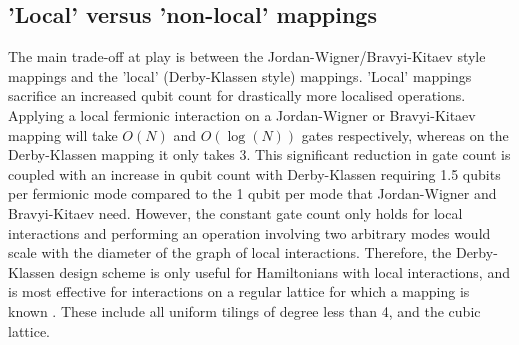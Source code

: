 \documentclass[twoside]{article}
\begin{document}
   \subsection{'Local' versus 'non-local' mappings}
The main trade-off at play is between the Jordan-Wigner/Bravyi-Kitaev style mappings and the 'local' (Derby-Klassen style) mappings. 'Local' mappings sacrifice an increased qubit count for drastically more localised operations. Applying a local fermionic interaction on a Jordan-Wigner or Bravyi-Kitaev mapping will take $O(N)$ and $O(\log(N))$ gates respectively, whereas on the Derby-Klassen mapping it only takes 3. This significant reduction in gate count is coupled with an increase in qubit count with Derby-Klassen requiring 1.5 qubits per fermionic mode compared to the 1 qubit per mode that Jordan-Wigner and Bravyi-Kitaev need. However, the constant gate count only holds for local interactions and performing an operation involving two arbitrary modes would scale with the diameter of the graph of local interactions. Therefore, the Derby-Klassen design scheme is only useful for Hamiltonians with local interactions, and is most effective for interactions on a regular lattice for which a mapping is known \cite{derbyklassen2}. These include all uniform tilings of degree less than 4, and the cubic lattice. 
\end{document}
